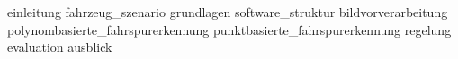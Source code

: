 {einleitung}
{fahrzeug_szenario}
{grundlagen}
{software_struktur}
{bildvorverarbeitung}
{polynombasierte_fahrspurerkennung}
{punktbasierte_fahrspurerkennung}
{regelung}
{evaluation}
{ausblick}
